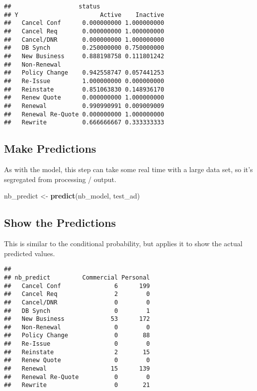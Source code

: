 \documentclass[]{article}
\newenvironment{Shaded}{\begin{snugshade}}{\end{snugshade}}
\newcommand{\KeywordTok}[1]{\textcolor[rgb]{0.13,0.29,0.53}{\textbf{#1}}}
\newcommand{\NormalTok}[1]{#1}
\newcommand{\OperatorTok}[1]{\textcolor[rgb]{0.81,0.36,0.00}{\textbf{#1}}}
\newcommand{\StringTok}[1]{\textcolor[rgb]{0.31,0.60,0.02}{#1}}
\begin{document}
\begin{verbatim}
##                   status
## Y                       Active    Inactive
##   Cancel Conf      0.000000000 1.000000000
##   Cancel Req       0.000000000 1.000000000
##   Cancel/DNR       0.000000000 1.000000000
##   DB Synch         0.250000000 0.750000000
##   New Business     0.888198758 0.111801242
##   Non-Renewal                             
##   Policy Change    0.942558747 0.057441253
##   Re-Issue         1.000000000 0.000000000
##   Reinstate        0.851063830 0.148936170
##   Renew Quote      0.000000000 1.000000000
##   Renewal          0.990990991 0.009009009
##   Renewal Re-Quote 0.000000000 1.000000000
##   Rewrite          0.666666667 0.333333333
\end{verbatim}

\hypertarget{make-predictions}{%
\subsection{Make Predictions}\label{make-predictions}}

As with the model, this step can take some real time with a large data
set, so it's segregated from processing / output.

\begin{Shaded}
\begin{Highlighting}[]
\NormalTok{nb_predict <-}\StringTok{ }\KeywordTok{predict}\NormalTok{(nb_model, test_ad)}
\end{Highlighting}
\end{Shaded}

\hypertarget{show-the-predictions}{%
\subsection{Show the Predictions}\label{show-the-predictions}}

This is similar to the conditional probability, but applies it to show
the actual predicted values.

\begin{Shaded}
\end{Shaded}

\begin{verbatim}
##                   
## nb_predict         Commercial Personal
##   Cancel Conf               6      199
##   Cancel Req                2        0
##   Cancel/DNR                0        0
##   DB Synch                  0        1
##   New Business             53      172
##   Non-Renewal               0        0
##   Policy Change             0       88
##   Re-Issue                  0        0
##   Reinstate                 2       15
##   Renew Quote               0        0
##   Renewal                  15      139
##   Renewal Re-Quote          0        0
##   Rewrite                   0       21
\end{verbatim}
\end{document}
